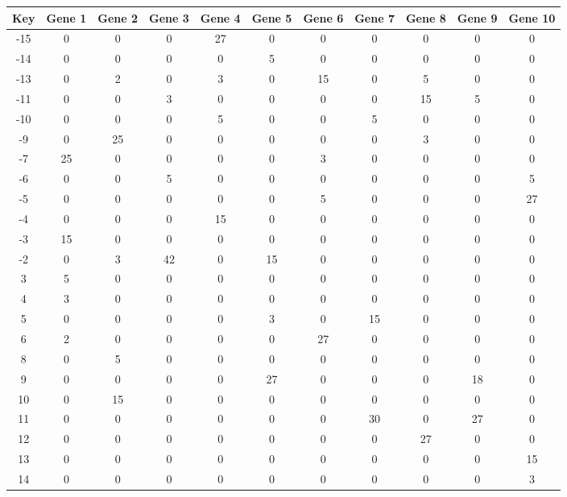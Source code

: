 \begin{tabular}{|c|c|c|c|c|c|c|c|c|c|c|}
\hline
Key & Gene 1 & Gene 2 & Gene 3 & Gene 4 & Gene 5 & Gene 6 & Gene 7 & Gene 8 & Gene 9 & Gene 10 \\
\hline
-15 & 0 & 0 & 0 & 27 & 0 & 0 & 0 & 0 & 0 & 0 \\
-14 & 0 & 0 & 0 & 0 & 5 & 0 & 0 & 0 & 0 & 0 \\
-13 & 0 & 2 & 0 & 3 & 0 & 15 & 0 & 5 & 0 & 0 \\
-11 & 0 & 0 & 3 & 0 & 0 & 0 & 0 & 15 & 5 & 0 \\
-10 & 0 & 0 & 0 & 5 & 0 & 0 & 5 & 0 & 0 & 0 \\
-9 & 0 & 25 & 0 & 0 & 0 & 0 & 0 & 3 & 0 & 0 \\
-7 & 25 & 0 & 0 & 0 & 0 & 3 & 0 & 0 & 0 & 0 \\
-6 & 0 & 0 & 5 & 0 & 0 & 0 & 0 & 0 & 0 & 5 \\
-5 & 0 & 0 & 0 & 0 & 0 & 5 & 0 & 0 & 0 & 27 \\
-4 & 0 & 0 & 0 & 15 & 0 & 0 & 0 & 0 & 0 & 0 \\
-3 & 15 & 0 & 0 & 0 & 0 & 0 & 0 & 0 & 0 & 0 \\
-2 & 0 & 3 & 42 & 0 & 15 & 0 & 0 & 0 & 0 & 0 \\
3 & 5 & 0 & 0 & 0 & 0 & 0 & 0 & 0 & 0 & 0 \\
4 & 3 & 0 & 0 & 0 & 0 & 0 & 0 & 0 & 0 & 0 \\
5 & 0 & 0 & 0 & 0 & 3 & 0 & 15 & 0 & 0 & 0 \\
6 & 2 & 0 & 0 & 0 & 0 & 27 & 0 & 0 & 0 & 0 \\
8 & 0 & 5 & 0 & 0 & 0 & 0 & 0 & 0 & 0 & 0 \\
9 & 0 & 0 & 0 & 0 & 27 & 0 & 0 & 0 & 18 & 0 \\
10 & 0 & 15 & 0 & 0 & 0 & 0 & 0 & 0 & 0 & 0 \\
11 & 0 & 0 & 0 & 0 & 0 & 0 & 30 & 0 & 27 & 0 \\
12 & 0 & 0 & 0 & 0 & 0 & 0 & 0 & 27 & 0 & 0 \\
13 & 0 & 0 & 0 & 0 & 0 & 0 & 0 & 0 & 0 & 15 \\
14 & 0 & 0 & 0 & 0 & 0 & 0 & 0 & 0 & 0 & 3 \\
\hline
\end{tabular}